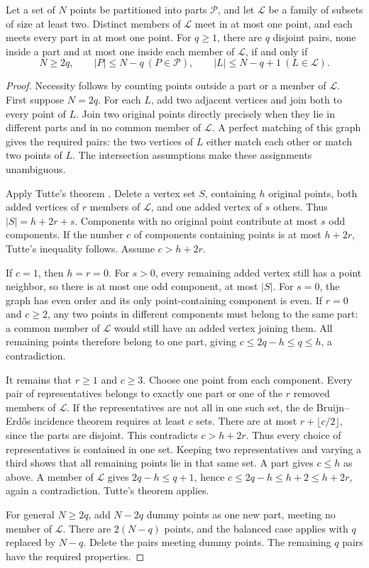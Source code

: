 \begin{lemma}\label{lem:block-capacity}
Let a set of $N$ points be partitioned into parts $\mathcal P$, and let
$\mathcal L$ be a family of subsets of size at least two. Distinct members
of $\mathcal L$ meet in at most one point, and each meets every part in
at most one point. For $q\ge1$, there are $q$ disjoint pairs, none inside a part and
at most one inside each member of $\mathcal L$, if and only if
\[
 N\ge2q,\qquad |P|\le N-q\ (P\in\mathcal P),\qquad
 |L|\le N-q+1\ (L\in\mathcal L).
\]
\end{lemma}
\begin{proof}
Necessity follows by counting points outside a part or a member of
$\mathcal L$. First suppose $N=2q$. For each $L$, add two adjacent
vertices and join both to every point of $L$. Join two original points
directly precisely when they lie in different parts and in no common
member of $\mathcal L$. A perfect matching of this graph gives the
required pairs: the two vertices of $L$ either match each other or
match two points of $L$. The intersection assumptions make these
assignments unambiguous.

Apply Tutte's theorem \cite{Tutte}. Delete a vertex set $S$, containing
$h$ original points, both added vertices of $r$ members of $\mathcal L$,
and one added vertex of $s$ others. Thus $|S|=h+2r+s$. Components with
no original point contribute at most $s$ odd components. If the number
$c$ of components containing points is at most $h+2r$, Tutte's inequality
follows. Assume $c>h+2r$.

If $c=1$, then $h=r=0$. For $s>0$, every remaining added vertex still
has a point neighbor, so there is at most one odd component, at most
$|S|$. For $s=0$, the graph has even order and its only point-containing
component is even. If $r=0$ and $c\ge2$, any two points in different
components must belong to the same part: a common member of
$\mathcal L$ would still have an added vertex joining them. All remaining points therefore
belong to one part, giving $c\le2q-h\le q\le h$, a contradiction.

It remains that $r\ge1$ and $c\ge3$. Choose one point from each component.
Every pair of representatives belongs to exactly one part or one of
the $r$ removed members of $\mathcal L$. If the representatives are not
all in one such set, the de Bruijn--Erd\H{o}s incidence theorem
\cite{deBruijnErdos} requires at least $c$ sets. There are at most
$r+\lfloor c/2\rfloor$, since the parts are disjoint. This contradicts
$c>h+2r$. Thus every choice of representatives is contained in one set.
Keeping two representatives and varying a third shows that all remaining
points lie in that same set. A part gives $c\le h$ as above. A member of
$\mathcal L$ gives $2q-h\le q+1$, hence
$c\le2q-h\le h+2\le h+2r$, again a contradiction. Tutte's theorem applies.

For general $N\ge2q$, add $N-2q$ dummy points as one new part, meeting
no member of $\mathcal L$. There are $2(N-q)$ points, and the balanced
case applies with $q$ replaced by $N-q$. Delete the pairs meeting
dummy points. The remaining $q$ pairs have the required properties.
\end{proof}

